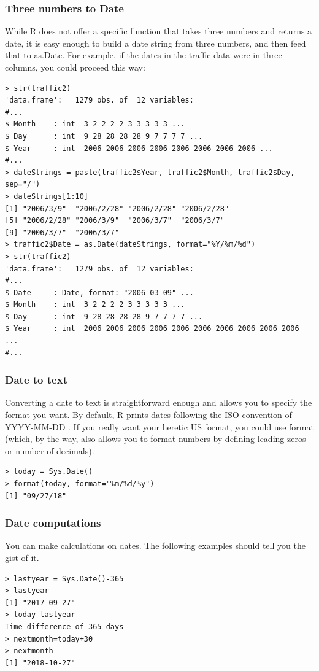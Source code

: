 \documentclass{report}
\newcommand{\code}[1]{\textsf{\ttfamily #1}}
\begin{document}
			\subsubsection{Three numbers to \code{Date}}
			While R does not offer a specific function that takes three numbers and returns a date, it is easy enough to build a date string from three numbers, and then feed that to \code{as.Date}. For example, if the dates in the traffic data were in three columns, you could proceed this way:
			
			\begin{verbatim}
> str(traffic2)
'data.frame':   1279 obs. of  12 variables:
#...
$ Month    : int  3 2 2 2 2 3 3 3 3 3 ...
$ Day      : int  9 28 28 28 28 9 7 7 7 7 ...
$ Year     : int  2006 2006 2006 2006 2006 2006 2006 2006 ...
#...
> dateStrings = paste(traffic2$Year, traffic2$Month, traffic2$Day, sep="/")
> dateStrings[1:10]
[1] "2006/3/9"  "2006/2/28" "2006/2/28" "2006/2/28"
[5] "2006/2/28" "2006/3/9"  "2006/3/7"  "2006/3/7" 
[9] "2006/3/7"  "2006/3/7" 
> traffic2$Date = as.Date(dateStrings, format="%Y/%m/%d")
> str(traffic2)
'data.frame':   1279 obs. of  12 variables:
#...
$ Date     : Date, format: "2006-03-09" ...
$ Month    : int  3 2 2 2 2 3 3 3 3 3 ...
$ Day      : int  9 28 28 28 28 9 7 7 7 7 ...
$ Year     : int  2006 2006 2006 2006 2006 2006 2006 2006 2006 2006 ...
#...
			\end{verbatim}
			
			\subsubsection{\code{Date} to text}
			Converting a date to text is straightforward enough and allows you to specify the format you want. By default, R prints dates following the ISO convention of YYYY-MM-DD \cite{calendar}. If you really want your heretic US format, you could use \code{format} (which, by the way, also allows you to format numbers by defining leading zeros or number of decimals).
			\begin{verbatim}
> today = Sys.Date()
> format(today, format="%m/%d/%y")
[1] "09/27/18"
			\end{verbatim}
			
			\subsubsection{\code{Date} computations}
			You can make calculations on dates. The following examples should tell you the gist of it.
			\begin{verbatim}
> lastyear = Sys.Date()-365
> lastyear
[1] "2017-09-27"
> today-lastyear
Time difference of 365 days
> nextmonth=today+30
> nextmonth
[1] "2018-10-27"
			\end{verbatim}
			
\end{document}
